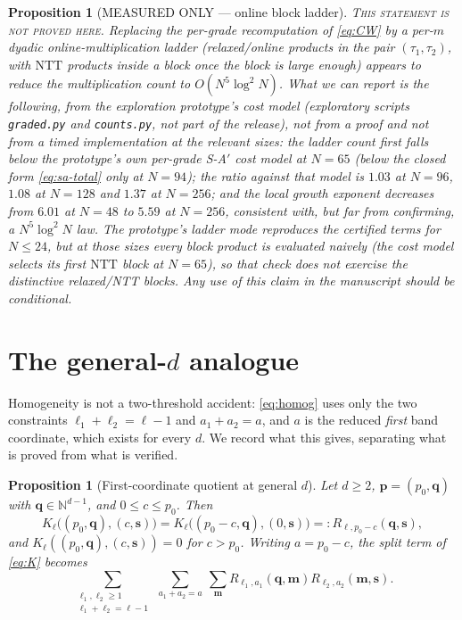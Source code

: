 \documentclass[11pt,reqno]{amsart}
\newtheorem{proposition}[theorem]{Proposition}
\theoremstyle{definition}
\theoremstyle{remark}
\newcommand{\N}{\mathbb N}
\begin{document}
\begin{proposition}[MEASURED ONLY --- online block
ladder]\label{prop:ladder}
\textsc{This statement is not proved here.}  Replacing the per-grade
recomputation of \eqref{eq:CW} by a per-$m$ dyadic online-multiplication
ladder (relaxed/online products in the pair $(\tau_1,\tau_2)$, with
$\mathrm{NTT}$ products inside a block once the block is large enough)
appears to reduce the multiplication count to $O(N^5\log^2N)$.  What we can
report is the following, from the exploration prototype's cost model
(exploratory scripts \texttt{graded.py} and \texttt{counts.py}, not part of the release), \emph{not} from a
proof and \emph{not} from a timed implementation at the relevant sizes:
the ladder count first falls below the prototype's own per-grade S-A$'$ cost
model at $N=65$ (below the closed form \eqref{eq:sa-total} only at $N=94$);
the ratio against that model
is $1.03$ at $N=96$, $1.08$ at $N=128$ and $1.37$ at $N=256$; and the local
growth exponent decreases from $6.01$ at $N=48$ to $5.59$ at $N=256$,
consistent with, but far from confirming, a $N^5\log^2N$ law.  The
prototype's ladder mode reproduces the certified terms for $N\leq24$, but at
those sizes every block product is evaluated naively (the cost model selects
its first $\mathrm{NTT}$ block at $N=65$), so that check does not exercise
the distinctive relaxed/NTT blocks.  Any use of this claim
in the manuscript should be conditional.
\end{proposition}

\section{The general-\texorpdfstring{$d$}{d} analogue}\label{sec:general-d}

Homogeneity is not a two-threshold accident: \eqref{eq:homog} uses only the
two constraints $\ell_1+\ell_2=\ell-1$ and $a_1+a_2=a$, and $a$ is the
reduced \emph{first} band coordinate, which exists for every $d$.  We record
what this gives, separating what is proved from what is verified.

\begin{proposition}[First-coordinate quotient at general
$d$]\label{prop:general-translation}
Let $d\geq2$, $\mathbf p=(p_0,\mathbf q)$ with $\mathbf q\in\N^{d-1}$, and
$0\leq c\leq p_0$.  Then
\[
 K_\ell\bigl((p_0,\mathbf q),(c,\mathbf s)\bigr)
 =K_\ell\bigl((p_0-c,\mathbf q),(0,\mathbf s)\bigr)
 =:R_{\ell,p_0-c}(\mathbf q,\mathbf s),
\]
and $K_\ell((p_0,\mathbf q),(c,\mathbf s))=0$ for $c>p_0$.  Writing
$a=p_0-c$, the split term of \eqref{eq:K} becomes
\begin{equation}\label{eq:general-split}
 \sum_{\substack{\ell_1,\ell_2\geq1\\ \ell_1+\ell_2=\ell-1}}
 \ \sum_{a_1+a_2=a}\ \sum_{\mathbf m}
 R_{\ell_1,a_1}(\mathbf q,\mathbf m)R_{\ell_2,a_2}(\mathbf m,\mathbf s).
\end{equation}
\end{proposition}
\end{document}
